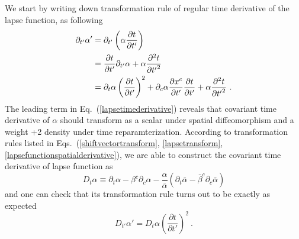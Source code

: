 We start by writing down transformation rule of regular time derivative of the lapse function, as following
\begin{align}\label{lapsetimederivative}
\partial_{t'}\alpha' & = \partial_{t'}\left(\alpha\frac{\partial t}{\partial t'}\right)\notag\\
& = \frac{\partial t}{\partial t'}\partial_{t'}\alpha + \alpha\frac{\partial^{2}t}{\partial {t'}^{2}}\notag\\
& = \partial_{t}\alpha\left(\frac{\partial t}{\partial t'}\right)^{2} + \partial_{c}\alpha\frac{\partial x^{c}}{\partial t'}\frac{\partial t}{\partial t'} + \alpha\frac{\partial^{2}t}{\partial {t'}^{2}} \ .
\end{align}
The leading term in Eq.~(\ref{lapsetimederivative}) reveals that covariant time derivative of $\alpha$ should transform as a scalar under spatial diffeomorphism and a weight +2 density under time reparamterization. According to transformation rules listed in Eqs.~(\ref{shiftvectortransform}, \ref{lapsetransform}, \ref{lapsefunctionspatialderivative}), we are able to construct the covariant time derivative of lapse function as
\begin{equation}\label{lapsecovarianttimederivative}
	D_{t}\alpha \equiv \partial_{t}\alpha - \beta^{c}\partial_{c}\alpha - \frac{\alpha}{{\bar \alpha}}\left(\partial_{t}{\bar \alpha} - {\bar \beta}^{c}\partial_{c}{\bar \alpha}\right) 
\end{equation}
and one can check that its transformation rule turns out to be exactly as expected
\begin{equation}
	D_{t'}\alpha' = D_{t}\alpha \left(\frac{\partial t}{\partial t'}\right)^{2} \ .
\end{equation}

